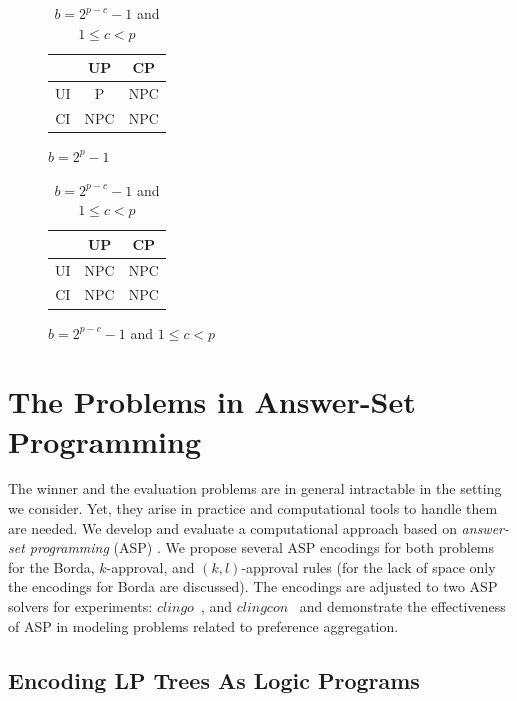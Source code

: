 \begin{table}
	\centering
	\caption{$b$-Borda}
  \begin{subfigure}[b]{0.5\textwidth}
		\centering
		\begin{tabular}[0.5\textwidth]{ | c | c | c | }
		  \hline
		    & UP & CP \\
		  \hline
		  UI & P & NPC \\
		  \hline
		  CI & NPC & NPC \\
		  \hline
		\end{tabular}
		\caption{$b=2^p-1$}
		\label{tbl:bBorda_comp_a}
	\end{subfigure}%
  \begin{subfigure}[b]{0.5\textwidth}
		\centering
		\begin{tabular}[0.5\textwidth]{ | c | c | c | }
		  \hline
		    & UP & CP \\
		  \hline
		  UI & NPC & NPC \\
		  \hline
		  CI & NPC & NPC \\
		  \hline
		\end{tabular}
		\caption{$b=2^{p-c}-1$ and $1 \leq c < p$}
		\label{tbl:bBorda_comp_b}
	\end{subfigure}
	\label{tbl:bBorda_comp}
\end{table}


\section{The Problems in Answer-Set Programming}

The winner and the evaluation problems are in general intractable in 
the setting we consider. Yet, they arise in practice and computational
tools to handle them are needed. We develop and evaluate
a computational approach based on \textit{answer-set programming} (ASP) 
\cite{mt99:stable}. We propose several ASP encodings for 
both problems for the Borda, $k$-approval, and
$(k,l)$-approval rules 
(for the lack of space only the encodings for Borda are discussed). 
The encodings are adjusted to two
ASP solvers for experiments: $\mathit{clingo}$~\cite{Gebser:clingo}, 
and $\mathit{clingcon}$~\cite{Ostrowski:clingcon} and demonstrate
the effectiveness of ASP in modeling problems related to preference 
aggregation.
  

\subsection{Encoding LP Trees As Logic Programs}

